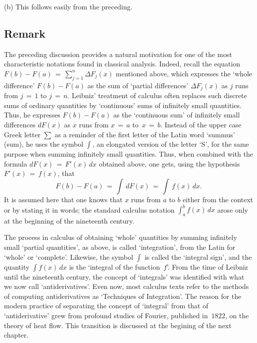 {\V

        (b) This follows easily from the preceding. \Q

\VV

            \subsection{\small{\bf Remark}}
            \label{RemrkE45.140}

\V

        The preceding discussion provides a natural motivation for one of the most characteristic notations found in classical analysis.
    Indeed, recall the equation $F(b)-F(a) \,=\, \sum_{j=1}^{n} {\Delta}F_{j}(x)$ mentioned above,
    which expresses the `whole difference' $F(b)-F(a)$ as the sum of `partial differences' ${\Delta}F_{j}(x)$ as $j$ runs from $j \,=\, 1$ to $j \,=\, n$. 
    Leibniz' treatment of calculus often replaces such discrete sums of ordinary quantities by `continuous' sums of infinitely small quantities.
    Thus, he expresses $F(b)-F(a)$ as the `continuous sum' of infinitely small differences $dF(x)$ as $x$ runs from $x \,=\, a$ to~$x \,=\, b$.
    Instead of the upper case Greek letter $\sum$ as a reminder of the first letter of the Latin word `summus' (sum),
    he uses the symbol ${\displaystyle \int}$, an elongated version of the letter `S', for the same purpose when summing infinitely small quantities.
    Thus, when combined with the formula $dF(x) \,=\, F'(x)\,dx$ obtained above, one gets, using the hypothesis $F'(x) \,=\, f(x)$, that
        \begin{displaymath}
        F(b) - F(a) \,=\, \int\,dF(x) \,=\, \int\,f(x)\,dx.
        \end{displaymath}
    It is assumed here that one knows that $x$ runs from $a$ to $b$ either from the context or by stating it in words;
    the standard calculus notation ${\displaystyle \int_{a}^{b} f(x)\,dx}$ arose only at the beginning of the nineteenth century.

        The process in calculus of obtaining `whole' quantities by summing infinitely small `partial quantities', as above,
    is called `integration', from the Latin for `whole' or `complete'.
    Likewise, the symbol ${\displaystyle \int}$ is called the `integral sign', and the quantity
    ${\displaystyle \int f(x)\,dx}$ is the `integral of the function~$f$'. From the time of Leibniz until the nineteenth century,
    the concept of `integrals' was identified with what we now call `antiderivatives'.
    Even now, most calculus texts refer to the methods of computing antiderivatives as `Techniques of Integration'.
    The reason for the modern practice of separating the concept of `integral' from that of `antiderivative'
    grew from profound studies of Fourier, published in~$1822$, on the theory of heat flow. This transition is discussed at the begining of the next chapter.


}
